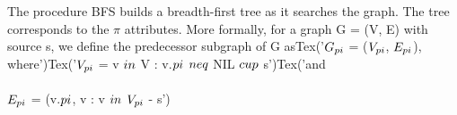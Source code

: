 \documentclass[preview]{standalone}
\begin{document}
\begin{center}
{The procedure BFS builds a breadth-first tree as it searches the graph. The tree corresponds to the $\pi$ attributes. More formally, for a graph G = (V, E) with source s, we define the predecessor subgraph of G asTex('$G_{\\pi}$ = ($V_{\\pi}$, $E_{\\pi}$), where')Tex('$V_{\\pi}$ = {v $\\in$ V : v.$\\pi$ $\\neq$ NIL} $\\cup$ {s}')Tex('and \\\\ $E_{\\pi}$ = {(v.$\\pi$, v} : v $\\in$ $V_{\\pi}$ - {s}}')
\end{center}
\end{document}
